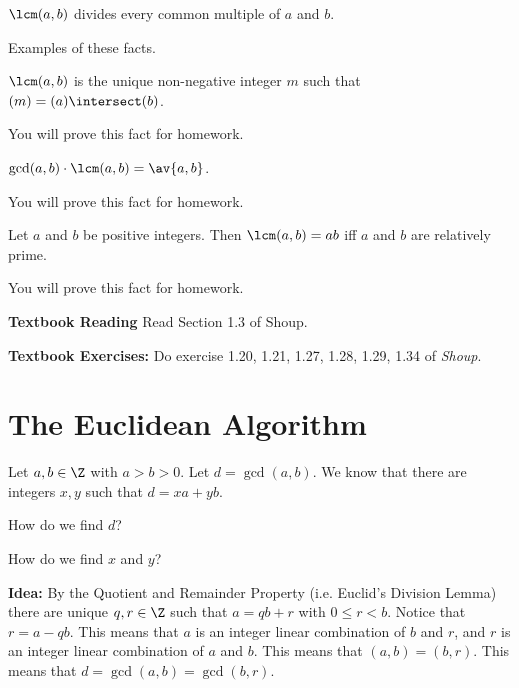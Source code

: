 \documentclass[oneside,12pt]{amsart}
\begin{document}
\begin{numbered_fact}
$\lcm(a,b)$ divides every common multiple of $a$ and $b$.
\end{numbered_fact}

\begin{in_class_example}
Examples of these facts.
\end{in_class_example}

\begin{fact}
$\lcm(a,b)$ is the unique non-negative integer $m$ such that $(m) = (a) \intersect (b)$.
\end{fact}
You will prove this fact for homework.

\begin{fact}
$\gcd(a,b) \cdot \lcm(a,b) = \av{a,b}$.
\end{fact}
You will prove this fact for homework.

\begin{fact}
Let $a$ and $b$ be positive integers. Then
$\lcm(a,b) = ab$ iff $a$ and $b$ are relatively prime.
\end{fact}
You will prove this fact for homework.

\textbf{Textbook Reading} Read Section 1.3 of Shoup.

\textbf{Textbook Exercises:} Do exercise 1.20, 1.21, 1.27, 1.28, 1.29, 1.34
of \emph{Shoup}.

\newpage

\section{The Euclidean Algorithm}

Let $a,b\in\Z$ with $a>b>0$. Let $d=\gcd(a,b)$. We know that there are integers $x,y$ such that $d=xa+yb$.

\begin{question}
How do we find $d$?
\end{question}

\begin{question}
How do we find $x$ and $y$?
\end{question}



\textbf{Idea:} By the Quotient and Remainder Property (i.e. Euclid's Division Lemma) there are
unique $q,r\in\Z$ such that $a=qb+r$ with $0\leq r < b$. Notice that $r=a-qb$. This means that
$a$ is an integer linear combination of $b$ and $r$, and $r$ is an integer linear combination
of $a$ and $b$. This means that $(a,b) = (b,r)$. This means that $d=\gcd(a,b)=\gcd(b,r)$.
\end{document}
